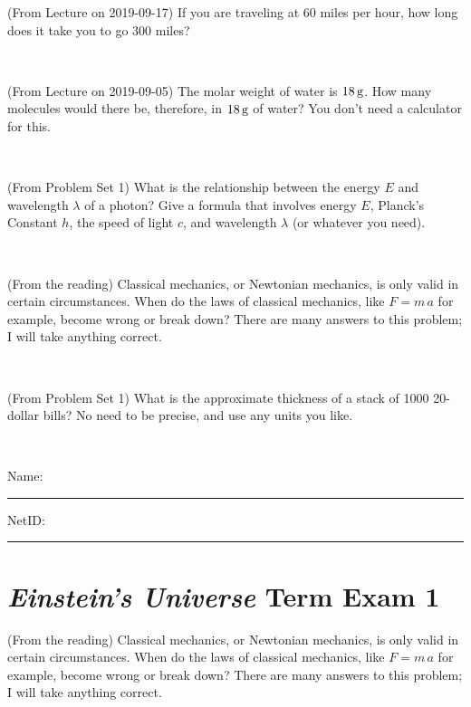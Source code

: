 \documentclass[12pt, letterpaper]{article}
\begin{document}
\begin{problem} (From Lecture on 2019-09-17)
If you are traveling at 60 miles per hour, how long does
it take you to go 300 miles?
\end{problem}


\vfill ~


\clearpage


\begin{problem} (From Lecture on 2019-09-05)
The molar weight of water is $18\,\mathrm{g}$. How many molecules would there
be, therefore, in $18\,\mathrm{g}$ of water? You don't need a calculator for
this.
\end{problem}


\vfill ~

\begin{problem} (From Problem Set 1)
What is the relationship between the energy $E$ and wavelength
$\lambda$ of a photon? Give a formula that involves energy $E$,
Planck's Constant $h$, the speed of light $c$, and wavelength
$\lambda$ (or whatever you need).
\end{problem}

\vfill ~

\begin{problem} (From the reading)
Classical mechanics, or Newtonian mechanics, is only valid in certain
circumstances. When do the laws of classical mechanics, like $F =
m\,a$ for example, become wrong or break down? There are many answers
to this problem; I will take anything correct.
\end{problem}


\vfill ~

\begin{problem} (From Problem Set 1)
What is the approximate thickness of a stack of 1000 20-dollar bills?
No need to be precise, and use any units you like.
\end{problem}


\vfill ~


\cleardoublepage



\noindent
Name: \rule[-1ex]{0.60\textwidth}{0.1pt}
NetID: \rule[-1ex]{0.20\textwidth}{0.1pt}

\section*{\textsl{Einstein's Universe} Term Exam 1}
\setcounter{problem}{1}


\begin{problem} (From the reading)
Classical mechanics, or Newtonian mechanics, is only valid in certain
circumstances. When do the laws of classical mechanics, like $F =
m\,a$ for example, become wrong or break down? There are many answers
to this problem; I will take anything correct.
\end{problem}
\end{document}
